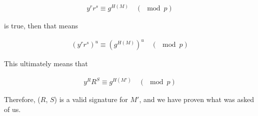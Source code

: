 \documentclass[11pt]{article}
\theoremstyle{definition}
\begin{document}
\begin{enumerate}
\begin{enumerate}
\begin{align*}
    y^rr^s \equiv g^{H(M)} \quad (\mod{p})
\end{align*}

is true, then that means 

\begin{align*}
    (y^rr^s)^u \equiv (g^{H(M)})^u \quad (\mod{p})
\end{align*}

This ultimately means that

\begin{align*}
    y^RR^S \equiv g^{H(M')} \quad (\mod{p})
\end{align*}

Therefore, ($R$, $S$) is a valid signature for $M'$, and we have proven what was asked of us.

\end{enumerate}
\end{enumerate}
\end{document}
